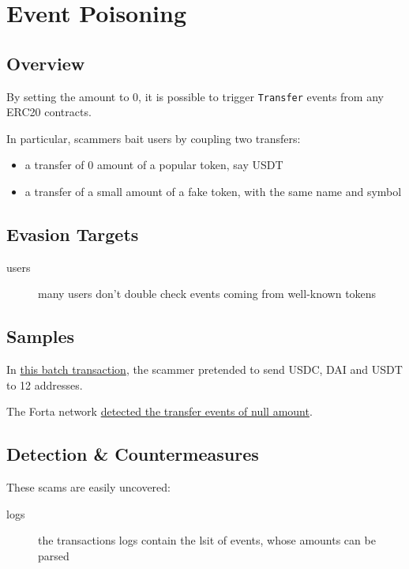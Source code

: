 \section{Event Poisoning} \label{sec:event-poisoning}

\subsection{Overview}

By setting the amount to 0, it is possible to trigger \lstinline[language=Solidity]{Transfer} events from any ERC20 contracts.

In particular, scammers  bait users by coupling two transfers:

\begin{itemize}
\item{a transfer of 0 amount of a popular token, say USDT}
\item{a transfer of a small amount of a fake token, with the same name and symbol}
\end{itemize}

\subsection{Evasion Targets}

\begin{description}
\item[users]{many users don't double check events coming from well-known tokens}
\end{description}

\subsection{Samples}

In \href{https://explorer.phalcon.xyz/tx/polygon/0x8a5f75338bfbf78b0969cdf5bacfe24c65e703ea94b430c470193b3d2a094441?line=1}{this batch transaction}, the scammer pretended to send USDC, DAI and USDT to 12 addresses.

The Forta network \href{https://explorer.forta.network/alert/0x51add5ade0777f3fd65efb97ea0055aa6a5329bcfa8266e11c9de28da81896d7}{detected the transfer events of null amount}.

\subsection{Detection \& Countermeasures}

These scams are easily uncovered:

\begin{description}
\item[logs]{the transactions logs contain the lsit of events, whose amounts can be parsed}
\end{description}